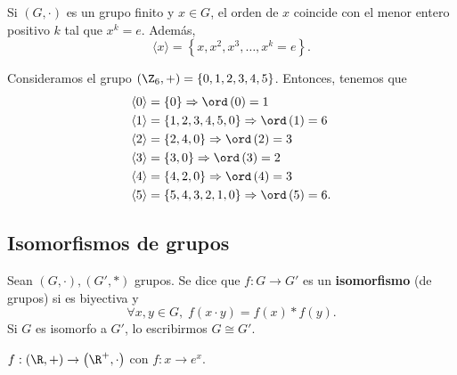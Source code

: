 \begin{fprop}[]
\normalfont Si $\displaystyle \left(G, \cdot\right) $ es un grupo finito y $\displaystyle x \in G $, el orden de $\displaystyle x $ coincide con el menor entero positivo $\displaystyle k $ tal que $\displaystyle x^{k} = e $. Además, 
\[\langle x \rangle = \left\{ x, x^{2}, x^{3}, \ldots, x^{k} = e\right\}  .\]
\end{fprop}

\begin{eg}
	\normalfont Consideramos el grupo $\displaystyle \left(\Z_{6}, +\right) = \left\{ 0, 1, 2, 3, 4, 5\right\} $. Entonces, tenemos que 
	\[
	\begin{split}
		\langle 0 \rangle & = \left\{ 0\right\} \Rightarrow \ord\left(0\right) = 1\\
		\langle 1 \rangle & = \left\{ 1, 2, 3, 4, 5, 0\right\} \Rightarrow \ord\left(1\right) = 6 \\
		\langle 2 \rangle & = \left\{ 2, 4, 0\right\} \Rightarrow \ord\left(2\right) = 3 \\
		\langle 3 \rangle & = \left\{ 3, 0\right\} \Rightarrow \ord\left(3\right) = 2 \\
		\langle 4 \rangle & = \left\{ 4, 2, 0\right\} \Rightarrow \ord\left(4\right) = 3\\
		\langle 5 \rangle & = \left\{ 5, 4, 3, 2, 1, 0\right\} \Rightarrow \ord\left(5\right) = 6 .
	\end{split}
	\]
\end{eg}

\subsection{Isomorfismos de grupos}
\begin{fdefinition}[Isomorfismo]
\normalfont Sean $\displaystyle \left(G, \cdot \right), \left(G', *\right) $ grupos. Se dice que $\displaystyle f: G \to G' $ es un \textbf{isomorfismo} (de grupos) si es biyectiva y 
\[\forall x, y \in G, \; f\left(x \cdot y\right) = f\left(x\right) * f\left(y\right) .\]
Si $\displaystyle G $ es isomorfo a $\displaystyle G' $, lo escribirmos $\displaystyle G \cong G' $.
\end{fdefinition}
\begin{eg}
\normalfont $\displaystyle f: \left(\R, +\right) \to \left(\R^{+}, \cdot \right) $ con $\displaystyle f : x \to e^{x} $.
\end{eg}

